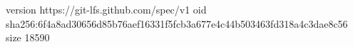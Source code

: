 version https://git-lfs.github.com/spec/v1
oid sha256:6f4a8ad30656d85b76aef16331f5fcb3a677e4c44b503463fd318a4c3dae8c56
size 18590
